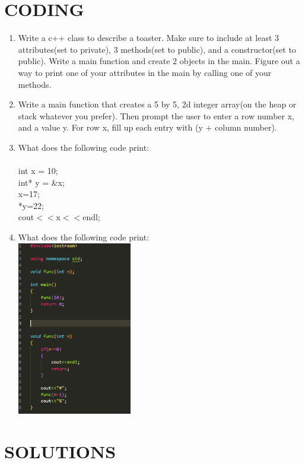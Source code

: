 \documentclass[a4paper]{article}
\begin{document}
\section{CODING}
\begin{enumerate}
    \item Write a c++ class to describe a toaster. Make sure to include at least
          3 attributes(set to private), 3 methods(set to public), and a 
          constructor(set to public). Write a main function and create 2 objects in the main. Figure out a way to print one 
          of your attributes in the main by calling one of your methods.
    \item Write a main function that creates a 5 by 5, 2d integer array(on the heap or 
          stack whatever you prefer). Then prompt the user to enter a row number x, and a value y. 
          For row x, fill up each entry with (y + column number).
    \item What does the following code print:\\\\
    \text{    }int x = 10;\\
    \text{    }int* y = \&x;\\
    \text{    }x=17;\\
    \text{    }*y=22;\\
    \text{    }cout$<<$x$<<$endl;\\
    \item What does the following code print:\\
    \includegraphics[width=5cm]{question2.png}
    
\end{enumerate} 
\newpage

\section{SOLUTIONS}
\end{document}
